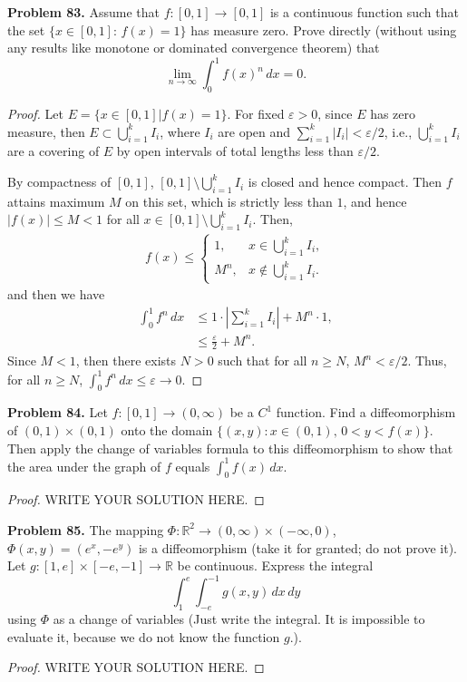 \documentclass[11pt]{article}
\theoremstyle{definition}
\theoremstyle{definition}
\begin{document}
\noindent
{\bf Problem 83.}
Assume that $f : [0, 1]\to [0, 1]$ is a continuous function such that the set
$\{x\in [0, 1] :\,  f(x) = 1\}$ has measure zero. Prove directly (without using any results like monotone or
dominated convergence theorem) that
$$
\lim_{n\to\infty} \int_0^1 f(x)^n\, dx =0.
$$
\begin{proof}
Let $E = \{x \in [0,1] | f(x) = 1\}$. For fixed $\varepsilon > 0$, since $E$ has zero measure, then $E \subset \bigcup^k_{i=1}I_i$, where $I_i$ are open and $\sum^k_{i=1}|I_i| < \varepsilon/2$, i.e., $\bigcup^k_{i=1}I_i$ are a covering of $E$ by open intervals of total lengths less than $\varepsilon/2$. 

By compactness of $[0,1]$, $[0,1]\setminus \bigcup^k_{i=1}I_i$ is closed and hence compact. Then $f$ attains maximum $M$ on this set, which is strictly less than $1$, and hence $|f(x)| \leq M < 1$ for all $x \in [0,1]\setminus \bigcup^k_{i=1}I_i$. Then,
\begin{align*}
    f(x) \leq \begin{cases}
        1, & x \in \bigcup^k_{i=1}I_i, \\
        M^n, & x \notin \bigcup^k_{i=1}I_i.
    \end{cases}
\end{align*}
and then we have
\begin{align*}
    \int^1_0 f^n\, dx & \leq 1 \cdot \left|\sum^k_{i=1} I_i \right| + M^n \cdot 1, \\
    & \leq \frac{\varepsilon}{2} + M^n.
\end{align*}
Since $M < 1$, then there exists $N > 0$ such that for all $n \geq N$, $M^n < \varepsilon/2$. Thus, for all $n \geq N$, $\int^1_0 f^n\, dx \leq \varepsilon \to 0$.
\end{proof}


\medskip

\noindent
{\bf Problem 84.}
Let $f:[0,1]\to (0,\infty)$ be a $C^1$ function. Find a diffeomorphism
of $(0,1)\times(0,1)$ onto the domain
$\{ (x,y): x\in (0,1),\, 0<y<f(x)\}$. Then apply the change of variables
formula to this diffeomorphism to show that the area under the graph of $f$ equals
$\int_0^1 f(x)\, dx$.
\begin{proof}
	WRITE YOUR SOLUTION HERE.
\end{proof}


\medskip

\noindent
{\bf Problem 85.}
The mapping $\Phi:\mathbb{R}^2\to (0,\infty)\times (-\infty,0)$,
$\Phi(x,y)=(e^x,-e^y)$ is a diffeomorphism (take it for granted; do not prove it).
Let $g:[1,e]\times [-e,-1]\to\mathbb{R}$
be continuous. Express the integral
$$
\int_1^e\int_{-e}^{-1} g(x,y)\, dx\, dy
$$
using $\Phi$ as a change of variables (Just write the integral. It is impossible to evaluate
it, because we do not know the function $g$.).
\begin{proof}
	WRITE YOUR SOLUTION HERE.
\end{proof}
\end{document}
